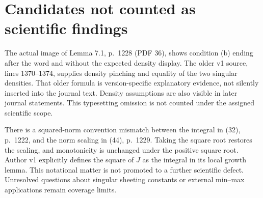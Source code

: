 \documentclass[10pt]{article}
\begin{document}
\section*{Candidates not counted as scientific findings}
The actual image of Lemma 7.1, p. 1228 (PDF 36), shows condition (b) ending after the word and without the expected density display. The older v1 source, lines 1370–1374, supplies density pinching and equality of the two singular densities. That older formula is version-specific explanatory evidence, not silently inserted into the journal text. Density assumptions are also visible in later journal statements. This typesetting omission is not counted under the assigned scientific scope.\par
There is a squared-norm convention mismatch between the integral in (32), p. 1222, and the norm scaling in (44), p. 1229. Taking the square root restores the scaling, and monotonicity is unchanged under the positive square root. Author v1 explicitly defines the square of \(J\) as the integral in its local growth lemma. This notational matter is not promoted to a further scientific defect. Unresolved questions about singular sheeting constants or external min–max applications remain coverage limits.\par
\end{document}

